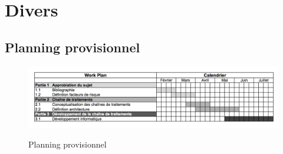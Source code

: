 \section{Divers}

\subsection{Planning provisionnel}


\begin{center}
\begin{figure}[h] \centering
\includegraphics[width=14cm]{GanttProvisoire}\\
\caption{\label{GanttProvisoire} Planning provisionnel}
\end{figure}
\end{center}


